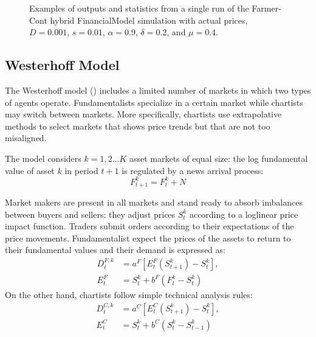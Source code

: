 \documentclass[runningheads]{llncs}
\begin{document}
\begin{figure}[htbp]
\begin{center}
{      }
    \caption{Examples of outputs and statistics from a single run of the Farmer-Cont hybrid FinancialModel simulation with actual prices, $D=0.001$, $s=0.01$, $\alpha=0.9$, $\delta=0.2$, and $\mu=0.4$.}
    \label{fig:FarmerContDynamics}
  \end{center}
\end{figure}

\subsection{Westerhoff Model}

The Westerhoff model (\cite{westerhoff2004}) includes a limited number of markets in which two types of agents operate. Fundamentalists specialize in a certain market while chartists may switch between markets. More specifically, chartists use extrapolative methods to select markets that shows price trends but that are not too misaligned.

The model considers $k = 1,2\dots K$ asset markets of equal size: the log fundamental value of asset $k$ in period $t + 1$ is regulated by a news arrival process:
\begin{equation*}
F_{t+1}^k = F_t^k + N
\end{equation*}

Market makers are present in all markets and stand ready to absorb imbalances between buyers and sellers: they adjust prices $S^k_t$ according to a loglinear price impact function.
Traders submit orders according to their expectations of the price movements. Fundamentalist expect the prices of the assets to return to their fundamental values and their demand is expressed as:
\begin{align*}
D_t^{F,k} &= a^F[E_t^F(S^k_{t+1}) - S^k_{t}],\\
E_t^F &= S^k_{t} + b^F(F_t^k - S^k_t)
\end{align*}
On the other hand, chartists follow simple technical analysis rules:
\begin{align*}
D_t^{C,k} &= a^C[E_t^C(S^k_{t+1}) - S^k_{t}],\\
E_t^C &= S^k_{t} + b^C(S_t^k - S^k_{t-1})
\end{align*}
\end{document}
